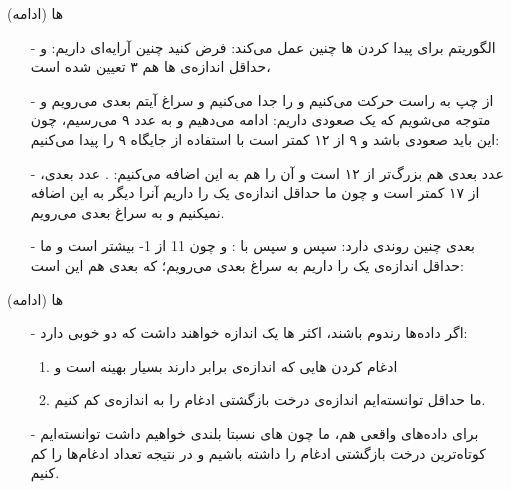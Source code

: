 \begin{frame}{ها (ادامه)}
\begin{itemize}\itemr
\item[-]
الگوریتم برای پیدا کردن ها چنین عمل می‌کند: فرض کنید چنین آرایه‌ای داریم:
\m{\left[8, 12, 9, 17, 15, -1, 22, 11, 10, 7\right]}
و حداقل اندازه‌ی ها هم ۳ تعیین شده است،

\item[-]
از چپ به راست حرکت می‌کنیم و 
\m{\left[8\right]}
را جدا می‌کنیم و سراغ آیتم بعدی می‌رویم و متوجه می‌شویم که یک  صعودی داریم:
\m{\left[8, 12\right]}
ادامه ‌می‌دهیم و به عدد ۹ می‌رسیم، چون این  باید صعودی باشد و ۹ از ۱۲ کمتر است با استفاده از  جایگاه ۹ را پیدا می‌کنیم:
\m{\left[8, 9, 12\right]}

\item[-]
عدد بعدی هم بزرگ‌تر از ۱۲ است و آن را هم به این  اضافه می‌کنیم:
\m{\left[8, 9, 12, 17\right]}.
عدد بعدی، از ۱۷ کمتر است و چون ما حداقل اندازه‌ی یک  را داریم آنرا دیگر به این  اضافه نمیکنیم و به سراغ  بعدی می‌رویم.

\item[-]
 بعدی چنین روندی دارد:
\m{\left[15\right]}
سپس 
\m{\left[15, -1\right]}
و سپس با :
\m{\left[22, 15, -1\right]}
و چون 11 از 1- بیشتر است و ما حداقل اندازه‌ی یک  را داریم به سراغ  بعدی می‌رویم؛ که  بعدی هم این است:
\m{\left[11, 10, 7\right]}
\end{itemize}
\end{frame}

\begin{frame}{ها (ادامه)}
\begin{itemize}\itemr
\item[-]
اگر داده‌ها رندوم باشند، اکثر ها یک اندازه خواهند داشت که دو خوبی دارد:
\begin{enumerate}\itemr
\item 
ادغام کردن هایی که اندازه‌ی برابر دارند بسیار بهینه است و
\item 
ما حداقل توانسته‌ایم اندازه‌ی درخت بازگشتی ادغام را به اندازه‌ی 
کم کنیم.
\end{enumerate}

\item[-]
برای داده‌های واقعی هم، ما چون های نسبتا بلندی خواهیم داشت توانسته‌ایم کوتاه‌ترین درخت بازگشتی ادغام را داشته باشیم و در نتیجه تعداد ادغام‌ها را کم کنیم.
\end{itemize}
\end{frame}